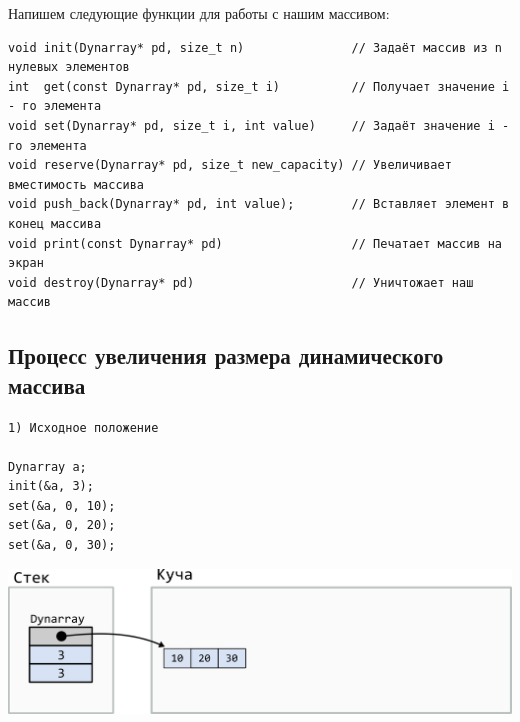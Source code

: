 \documentclass[10pt]{article}
\begin{document}
Напишем следующие функции для работы с нашим массивом:
\begin{lstlisting}
void init(Dynarray* pd, size_t n)               // Задаёт массив из n нулевых элементов
int  get(const Dynarray* pd, size_t i)          // Получает значение i - го элемента
void set(Dynarray* pd, size_t i, int value)     // Задаёт значение i - го элемента
void reserve(Dynarray* pd, size_t new_capacity) // Увеличивает вместимость массива
void push_back(Dynarray* pd, int value);        // Вставляет элемент в конец массива
void print(const Dynarray* pd)                  // Печатает массив на экран
void destroy(Dynarray* pd)                      // Уничтожает наш массив
\end{lstlisting}




\newpage
\subsection*{Процесс увеличения размера динамического массива}
\noindent\begin{minipage}{.40\textwidth}
\begin{lstlisting}
1) Исходное положение

Dynarray a;
init(&a, 3);
set(&a, 0, 10);
set(&a, 0, 20);
set(&a, 0, 30);
\end{lstlisting}
\end{minipage}
\begin{minipage}{.50\textwidth}
\includegraphics[scale=0.8]{../images/dynarray1.png}
\end{minipage}
\quad\\
\quad\\
\quad\\
\quad\\
\quad\\
\end{document}
